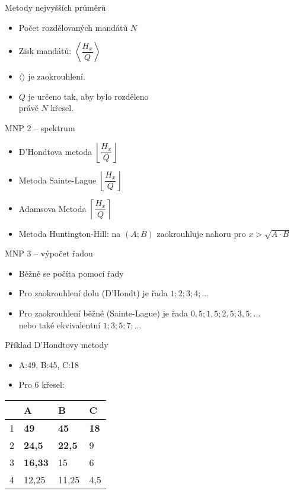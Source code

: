 \documentclass[17pt]{beamer}
\begin{document}
\begin{frame}{Metody nejvyšších průměrů}
\begin{itemize}
\item Počet rozdělovaných mandátů $N$
\item Zisk mandátů: $\left\langle\dfrac{H_{x}}{Q}\right\rangle$
\item $\langle$\hspace{0.15cm}$\rangle$ je zaokrouhlení.
\item $Q$ je určeno tak, aby bylo rozděleno \\ právě $N$ křesel.
\end{itemize}
\end{frame}

\begin{frame}{MNP 2 -- spektrum}
\begin{itemize}
\item D'Hondtova metoda $\left\lfloor\dfrac{H_{x}}{Q}\right\rfloor$
\item Metoda Sainte-Lague $\left\lfloor\dfrac{H_{x}}{Q}\right\rfloor$
\item Adamsova Metoda $\left\lceil\dfrac{H_{x}}{Q}\right\rceil$
\item Metoda Huntington-Hill: na $(A;B)$ zaokrouhluje nahoru pro $x>\sqrt{A\cdot B}$
\end{itemize}
\end{frame}

\begin{frame}{MNP 3 -- výpočet řadou}
\begin{itemize}
\item Běžně se počíta pomocí řady 
\item Pro zaokrouhlení dolu (D'Hondt) je řada $1; 2; 3; 4; ...$
\item Pro zaokrouhlení běžné (Sainte-Lague) je řada $0{,}5; 1{,}5; 2{,}5; 3{,}5; ...$
\\ nebo také ekvivalentní $1; 3; 5; 7; ...$
\end{itemize}
\end{frame}

\begin{frame}{Příklad D'Hondtovy metody}
\begin{itemize}
\item A:49, B:45, C:18
\item Pro 6 křesel:
\end{itemize}
\begin{center}
\begin{tabular}{|C{2cm}|C{2cm}|C{2cm}|C{2cm}|}
\hline 
 & A & B & C \\ 
 & \textbf{49} & \textbf{45} & \textbf{18} \\ 
 & \textbf{24,5} & \textbf{22,5} & 9 \\ 
 & \textbf{16,33} & 15 & 6 \\ 
 & 12,25 & 11,25 & 4,5 \\ 
\hline 
\end{tabular} 
\end{center}
\end{frame}
\end{document}
